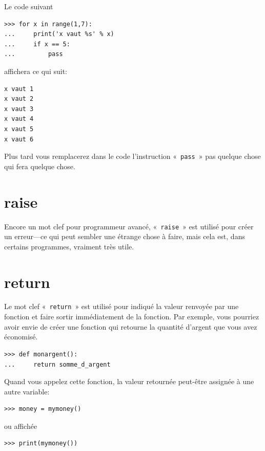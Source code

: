 Le code suivant
\begin{Verbatim}[frame=single,rulecolor=\color{gray}]
>>> for x in range(1,7):
...     print('x vaut %s' % x)
...     if x == 5:
...         pass
\end{Verbatim}

affichera ce qui suit:


\begin{Verbatim}[frame=single,rulecolor=\color{gray}]
x vaut 1
x vaut 2
x vaut 3
x vaut 4
x vaut 5
x vaut 6
\end{Verbatim}

Plus tard vous remplacerez dans le code l'instruction «~\texttt{pass}~» pas quelque chose qui fera quelque chose.



\section*{raise}

Encore un mot clef pour programmeur avancé, «~\texttt{raise}~» est utilisé pour créer un erreur---ce qui peut sembler une étrange chose à faire, mais cela est, dans certains programmes, vraiment très utile.

\section*{return}
Le mot clef «~\texttt{return}~» est utilisé pour indiqué la valeur renvoyée par une fonction et faire sortir immédiatement de la fonction. Par exemple, vous pourriez avoir envie de créer une fonction qui retourne la quantité d'argent que vous avez économisé.


\begin{Verbatim}[frame=single,rulecolor=\color{gray}]
>>> def monargent():
...     return somme_d_argent
\end{Verbatim}

Quand vous appelez cette fonction, la valeur retournée peut-être assignée à une autre variable:
\begin{Verbatim}[frame=single,rulecolor=\color{gray}]
>>> money = mymoney()
\end{Verbatim}

ou affichée

\begin{Verbatim}[frame=single,rulecolor=\color{gray}]
>>> print(mymoney())
\end{Verbatim}

